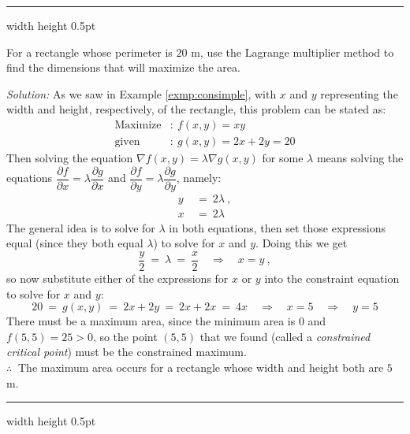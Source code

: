 \vspace{3mm}
\hrule width \textwidth height 0.5pt
\begin{exmp}\label{exmp:rectlm}
 For a rectangle whose perimeter is $20$ m, use the Lagrange multiplier method to find the dimensions that will
 maximize the area.\vspace{1mm}
 \par\noindent \emph{Solution:} As we saw in Example \ref{exmp:consimple}, with $x$ and $y$ representing the width and
  height, respectively, of the rectangle, this problem can be stated as:
 \begin{align*}
  \text{Maximize}&: ~ f(x,y) = xy\\
  \text{given}&: ~ g(x,y) = 2x + 2y = 20
 \end{align*}
 Then solving the equation $\nabla f(x,y) = \lambda \nabla g(x,y)$ for some $\lambda$ means solving the equations
\newpage
\noindent $\dfrac{\partial f}{\partial x} = \lambda \dfrac{\partial g}{\partial x}$ and
 $\dfrac{\partial f}{\partial y} = \lambda \dfrac{\partial g}{\partial y}$, namely:
 \begin{align*}
  y ~&=~ 2\lambda ~,\\
  x ~&=~ 2\lambda
 \end{align*}
 The general idea is to solve for $\lambda$ in both equations, then set those expressions equal (since they both equal
 $\lambda$) to solve for $x$ and $y$. Doing this we get
 \begin{displaymath}
  \frac{y}{2} ~=~ \lambda ~=~ \frac{x}{2} \quad \Rightarrow \quad x = y ~,
 \end{displaymath}
 so now substitute either of the expressions for $x$ or $y$ into the constraint equation to solve for $x$ and $y$:
 \begin{displaymath}
  20 ~=~ g(x,y) ~=~ 2x + 2y ~= ~2x + 2x ~=~ 4x \quad \Rightarrow \quad x = 5 \quad \Rightarrow \quad y = 5
 \end{displaymath}
 There must be a maximum area, since the minimum area is $0$ and $f(5,5) = 25 > 0$, so the point $(5,5)$ that we found
 (called a \emph{constrained critical point}) must be the constrained maximum.\\
 $\therefore ~$ The maximum area occurs for a rectangle whose width and height both are $5$ m.
\end{exmp}
\hrule width \textwidth height 0.5pt
